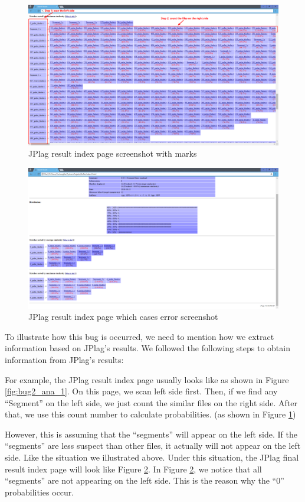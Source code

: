 \documentclass[twoside,a4paper]{refart}
\begin{document}
\begin{figure}[!h]
\centering
\includegraphics[width=12cm]{img/JPlag_2.png}
\caption{JPlag result index page screenshot with marks}
\label{fig:bug2_ana_2}
\end{figure}

\begin{figure}[!h]
\centering
\includegraphics[width=12cm]{img/JPlag_3.png}
\caption{JPlag result index page which cases error screenshot}
\label{fig:bug2_ana_3}
\end{figure}

To illustrate how this bug is occurred, we need to mention how we extract information based on JPlag's results. We followed the following steps to obtain information from JPlag's results:

For example, the JPlag result index page usually looks like as shown in Figure \ref{fig:bug2_ana_1}. On this page, we scan left side first. Then, if we find any \enquote{Segment} on the left side, we just count the similar files on the right side. After that, we use this count number to calculate probabilities. (as shown in Figure \ref{fig:bug2_ana_2})

However, this is assuming that the \enquote{segments} will appear on the left side. If the \enquote{segments} are less suspect than other files, it actually will not appear on the left side. Like the situation we illustrated above. Under this situation, the JPlag final result index page will look like Figure \ref{fig:bug2_ana_3}. In Figure \ref{fig:bug2_ana_3}, we notice that all \enquote{segments} are not appearing on the left side. This is the reason why the \enquote{0} probabilities occur.
\end{document}
